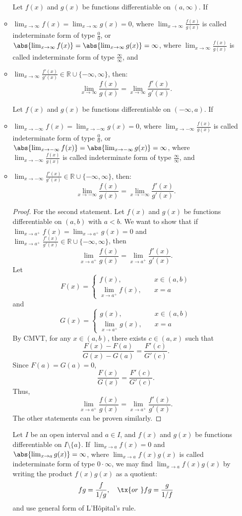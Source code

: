 \documentclass[a4paper,12pt]{report}
\begin{document}
\begin{itemize}
\begin{itemize}
Let $f(x)$ and $g(x)$ be functions differentiable on $(a,\infty)$. If
\bit
\item $\lim_{x\to\infty}f(x)=\lim_{x\to\infty}g(x)=0$, where $\lim_{x\to\infty}\frac{f(x)}{g(x)}$ is called indeterminate form of type $\frac{0}{0}$, or $\abs{\lim_{x\to\infty}f(x)}=\abs{\lim_{x\to\infty}g(x)}=\infty$, where $\lim_{x\to\infty}\frac{f(x)}{g(x)}$ is called indeterminate form of type $\frac{\infty}{\infty}$, and
\item $\lim_{x\to\infty}\frac{f'(x)}{g'(x)}\in\mathbb{R}\cup\{-\infty,\infty\}$,
\eit
then:
\[\lim_{x\to\infty}\frac{f(x)}{g(x)}=\lim_{x\to\infty}\frac{f'(x)}{g'(x)}.\]

Let $f(x)$ and $g(x)$ be functions differentiable on $(-\infty,a)$. If
\bit
\item $\lim_{x\to -\infty}f(x)=\lim_{x\to -\infty}g(x)=0$, where $\lim_{x\to -\infty}\frac{f(x)}{g(x)}$ is called indeterminate form of type $\frac{0}{0}$, or $\abs{\lim_{x\to -\infty}f(x)}=\abs{\lim_{x\to -\infty}g(x)}=\infty$, where $\lim_{x\to -\infty}\frac{f(x)}{g(x)}$ is called indeterminate form of type $\frac{\infty}{\infty}$, and
\item $\lim_{x\to -\infty}\frac{f'(x)}{g'(x)}\in\mathbb{R}\cup\{-\infty,\infty\}$,
\eit
then:
\[\lim_{x\to -\infty}\frac{f(x)}{g(x)}=\lim_{x\to -\infty}\frac{f'(x)}{g'(x)}.\]
\begin{proof}
For the second statement. Let $f(x)$ and $g(x)$ be functions differentiable on $(a,b)$ with $a<b$. We want to show that if $\lim_{x\to a^+}f(x)=\lim_{x\to a^+}g(x)=0$ and $\lim_{x\to a^+}\frac{f'(x)}{g'(x)}\in\mathbb{R}\cup\{-\infty,\infty\}$, then
\[\lim_{x\to a^+}\frac{f(x)}{g(x)}=\lim_{x\to a^+}\frac{f'(x)}{g'(x)}.\]
Let
\[F(x)=\begin{cases}f(x),\quad & x\in (a,b)\\
\lim_{x\to a^+}f(x),\quad & x=a\end{cases}\]
and
\[G(x)=\begin{cases}g(x),\quad & x\in (a,b)\\
\lim_{x\to a^+}g(x),\quad & x=a\end{cases}\]
By CMVT, for any $x\in (a,b)$, there exists $c\in (a,x)$ such that
\[\frac{F(x)-F(a)}{G(x)-G(a)}=\frac{F'(c)}{G'(c)}.\]
Since $F(a)=G(a)=0$,
\[\frac{F(x)}{G(x)}=\frac{F'(c)}{G'(c)}.\]
Thus,
\[\lim_{x\to a^+}\frac{f(x)}{g(x)}=\lim_{x\to a^+}\frac{f'(x)}{g'(x)}.\]
The other statements can be proven similarly.
\end{proof}
Let $I$ be an open interval and $a\in I$, and $f(x)$ and $g(x)$ be functions differentiable on $I\setminus\{a\}$. If $\lim_{x\to a}f(x)=0$ and $\abs{\lim_{x\to a}g(x)}=\infty$, where $\lim_{x\to a}f(x)g(x)$ is called indeterminate form of type $0\cdot\infty$, we may find $\lim_{x\to a}f(x)g(x)$ by writing the product $f(x)g(x)$ as a quotient:
\[fg=\frac{f}{1/g},\quad\tx{or\ }fg=\frac{g}{1/f}\]
and use general form of L'Hôpital's rule.


\end{itemize}
\end{itemize}
\end{document}
